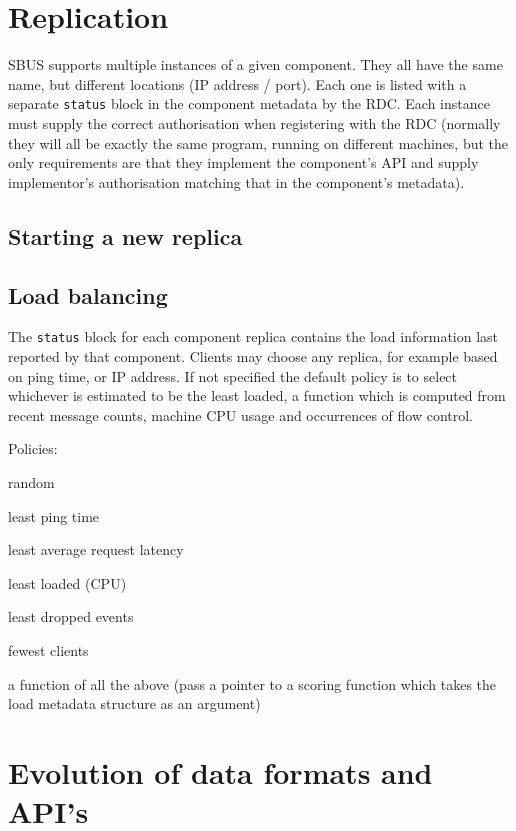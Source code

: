 \documentclass[12pt,a4paper,twoside]{article}
\renewcommand{\_}{\texttt{\symbol{95}}}
\begin{document}
\section{Replication}

SBUS supports multiple instances of a given component. They all have
the same name, but different locations (IP address / port). Each one is
listed with a separate \verb^status^ block in the component metadata by
the RDC. Each instance must supply the correct authorisation when
registering with the RDC (normally they will all be exactly the same
program, running on different machines, but the only requirements are
that they implement the component's API and supply implementor's
authorisation matching that in the component's metadata).

\subsection{Starting a new replica}

\subsection{Load balancing}

The \verb^status^ block for each component replica contains the load
information last reported by that component. Clients may choose any
replica, for example based on ping time, or IP address. If not
specified the default policy is to select whichever is estimated to be
the least loaded, a function which is computed from recent message
counts, machine CPU usage and occurrences of flow control.

Policies:

\begin{bulletlist}
\item random
\item least ping time
\item least average request latency
\item least loaded (CPU)
\item least dropped events
\item fewest clients
\item a function of all the above (pass a pointer to a scoring function which
	takes the load metadata structure as an argument)
\end{bulletlist}

\section{Evolution of data formats and API's}
\end{document}
